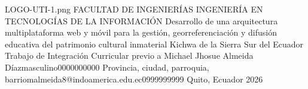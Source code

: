 \documentclass[12pt,a4paper,oneside]{report}
\begin{document}
\UTIPortada
{LOGO-UTI-1.png} %
{FACULTAD DE INGENIERÍAS} %
{INGENIERÍA EN TECNOLOGÍAS DE LA INFORMACIÓN} %
{Desarrollo de una arquitectura multiplataforma web y móvil para la gestión, georreferenciación y difusión educativa del patrimonio cultural inmaterial Kichwa de la Sierra Sur del Ecuador} %
{Trabajo de Integración Curricular previo a \UTIFraseTituloPortada} %
{\UTIDatosAutores
  {Michael Jhosue Almeida Díaz}{masculino}{0000000000}
  {Provincia, ciudad, parroquia, barrio}{malmeida8@indoamerica.edu.ec}{0999999999}}
{} %
{Quito, Ecuador} %
{2026} %

\UTIFrontMatter


















\UTIMainMatter
\end{document}
